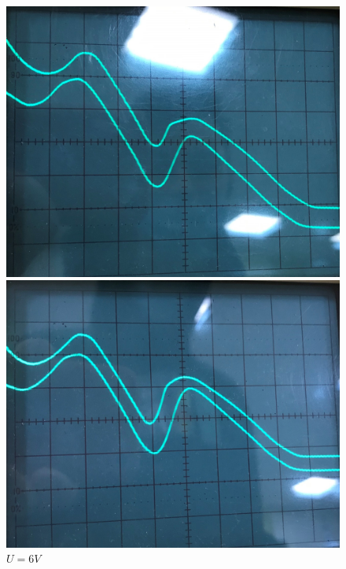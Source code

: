 \documentclass[a4paper,12pt]{article}
\begin{document}
    \begin{figure}[h!]
        \begin{center}
            \begin{minipage}{0.32\textwidth}
                \includegraphics[width=\textwidth]{4}
                \caption{$U = 4V$}
            \end{minipage}
            \hfill
            \begin{minipage}{0.32\textwidth}
                \includegraphics[width=\textwidth]{6}
                \caption{$U = 6V$}
            \end{minipage}

\end{center}
\end{figure}
\end{document}
